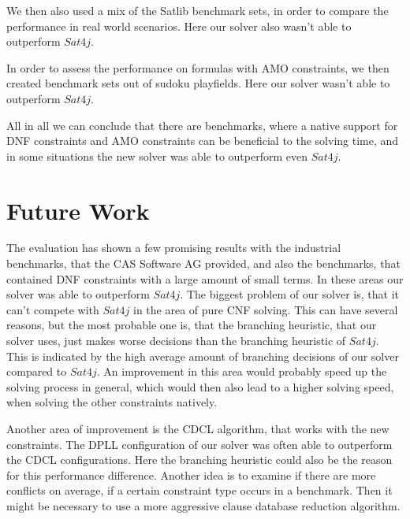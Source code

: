 We then also used a mix of the Satlib benchmark sets, in order to compare the performance in real world scenarios. Here our solver also wasn't able to outperform $Sat4j$.

In order to assess the performance on formulas with AMO constraints, we then created benchmark sets out of sudoku playfields. Here our solver wasn't able to outperform $Sat4j$.

All in all we can conclude that there are benchmarks, where a native support for DNF constraints and AMO constraints can be beneficial to the solving time, and in some situations the new solver was able to outperform even $Sat4j$.

\section{Future Work}

The evaluation has shown a few promising results with the industrial benchmarks, that the CAS Software AG provided, and also the benchmarks, that contained DNF constraints with a large amount of small terms. In these areas our solver was able to outperform $Sat4j$. The biggest problem of our solver is, that it can't compete with $Sat4j$ in the area of pure CNF solving. This can have several reasons, but the most probable one is, that the branching heuristic, that our solver uses, just makes worse decisions than the branching heuristic of $Sat4j$. This is indicated by the high average amount of branching decisions of our solver compared to $Sat4j$. An improvement in this area would probably speed up the solving process in general, which would then also lead to a higher solving speed, when solving the other constraints natively.

Another area of improvement is the CDCL algorithm, that works with the new constraints. The DPLL configuration of our solver was often able to outperform the CDCL configurations. Here the branching heuristic could also be the reason for this performance difference. Another idea is to examine if there are more conflicts on average, if a certain constraint type occurs in a benchmark. Then it might be necessary to use a more aggressive clause database reduction algorithm.
